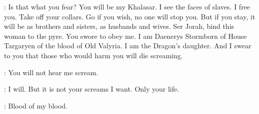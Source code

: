 \DAENERYS: Is that what you fear?   You will be my Khalasar. I see the faces of slaves. I free you. Take off your collars. Go if you wish, no one will stop you. But if you stay, it will be as brothers and sisters, as husbands and wives. Ser Jorah, bind this woman to the pyre. You swore to obey me. I am Daenerys Stormborn of House Targaryen of the blood of Old Valyria. I am the Dragon's daughter. And I swear to you that those who would harm you will die screaming. 

\MIRRI: You will not hear me scream. 

\DAENERYS: I will. But it is not your screams I want. Only your life. 


\JORAH:  Blood of my blood. 


